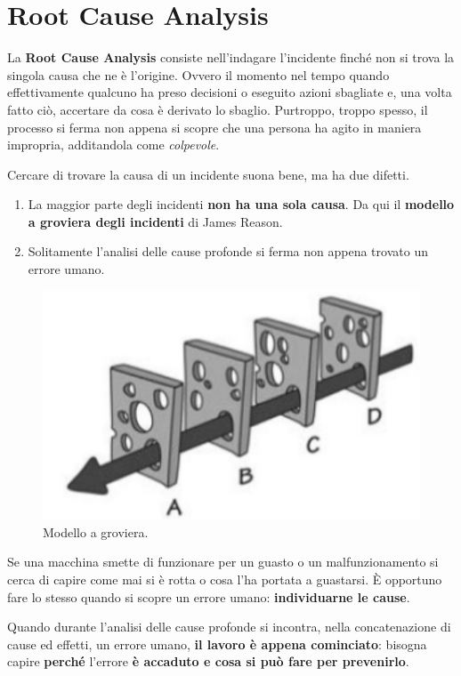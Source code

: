 \documentclass[a4paper,11pt,oneside]{book}
\begin{document}
\section{Root Cause Analysis}
La \textbf{Root Cause Analysis} consiste nell'indagare l'incidente finché non si trova la singola causa che ne è l'origine. Ovvero il momento nel tempo quando effettivamente qualcuno ha preso decisioni o eseguito azioni sbagliate e,
una volta fatto ciò, accertare da cosa è derivato lo sbaglio. Purtroppo, troppo spesso, il processo si ferma non appena si scopre che una persona ha agito in maniera impropria, additandola come \textit{colpevole}.

Cercare di trovare la causa di un incidente suona bene, ma ha due difetti.

\begin{enumerate}
	\item La maggior parte degli incidenti \textbf{non ha una sola causa}. Da qui il \textbf{modello a groviera degli incidenti} di James Reason.
	\item Solitamente l'analisi delle cause profonde si ferma non appena trovato un errore umano.
\end{enumerate}

\pagebreak

\begin{figure}[!h]
	\centering
	\includegraphics[scale=0.55]{immagini/Groviera.png}
	\caption{Modello a groviera.}
\end{figure}

Se una macchina smette di funzionare per un guasto o un malfunzionamento
si cerca di capire come mai si è rotta o cosa l'ha portata a guastarsi. È
opportuno fare lo stesso quando si scopre un errore umano: \textbf{individuarne le cause}.

Quando durante l'analisi delle cause profonde si incontra, nella concatenazione di cause ed effetti, un errore umano, \textbf{il lavoro è appena cominciato}: bisogna capire \textbf{perché} l'errore \textbf{è accaduto e cosa si può fare per prevenirlo}.
\end{document}
